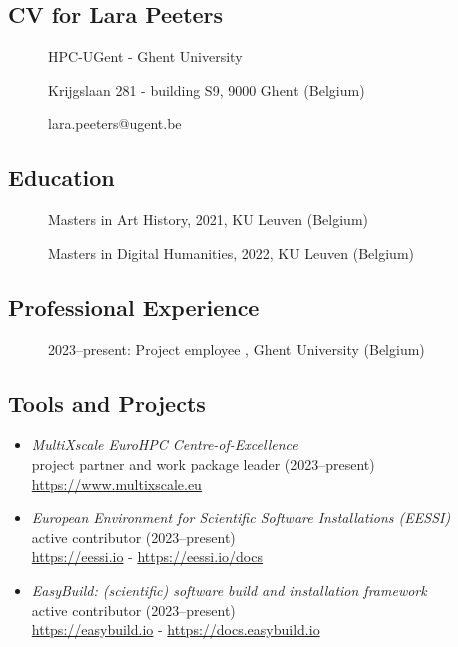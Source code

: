 
\subsection{CV for Lara Peeters}
\begin{description}
\item[] HPC-UGent - Ghent University
\item[] Krijgslaan 281 - building S9, 9000 Ghent (Belgium)
\item[] lara.peeters@ugent.be
\end{description}

\subsection*{Education}
\begin{description}
    \item[] Masters in Art History, 2021, KU Leuven (Belgium)
    \item[] Masters in Digital Humanities, 2022, KU Leuven (Belgium)
\end{description}

\subsection*{Professional Experience}
\begin{description}
    \item[] 2023--present: Project employee , Ghent University (Belgium)
\end{description}

\subsection*{Tools and Projects}

\begin{itemize}
    \item[] \emph{MultiXscale EuroHPC Centre-of-Excellence}
        \\project partner and work package leader (2023--present)
        \\{\small{\url{https://www.multixscale.eu}}}
    \item[] \emph{European Environment for Scientific Software Installations (EESSI)}
        \\active contributor (2023--present)
        \\{\small{\url{https://eessi.io} - \url{https://eessi.io/docs}}}
    \item[] \emph{EasyBuild: (scientific) software build and installation framework}
        \\active contributor (2023--present)
        \\{\small{\url{https://easybuild.io} - \url{https://docs.easybuild.io}}}
\end{itemize}

